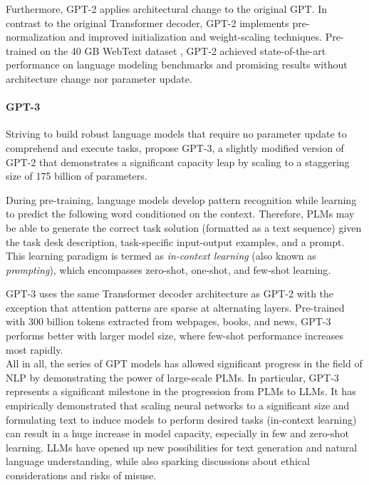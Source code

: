 Furthermore, \ac{GPT}-2 applies architectural change to the original \ac{GPT}. In contrast to the original Transformer decoder, \ac{GPT}-2 implements pre-normalization and improved initialization and weight-scaling techniques. Pre-trained on the 40 GB WebText dataset \citep{radford2019language}, \ac{GPT}-2 achieved state-of-the-art performance on language modeling benchmarks and promising results without architecture change nor parameter update.


\paragraph{GPT-3}

Striving to build robust language models that require no parameter update to comprehend and execute tasks, \citet{brown2020language} propose \ac{GPT}-3, a slightly modified version of \ac{GPT}-2 that demonstrates a significant capacity leap by scaling to a staggering size of 175 billion of parameters. 

During pre-training, language models develop pattern recognition while learning to predict the following word conditioned on the context. Therefore, \acp{PLM} may be able to generate the correct task solution (formatted as a text sequence) given the task desk description, task-specific input-output examples, and a prompt. This learning paradigm is termed as \textit{in-context learning} (also known as \textit{prompting}), which encompasses zero-shot, one-shot, and few-shot learning. 

\ac{GPT}-3 uses the same Transformer decoder architecture as \ac{GPT}-2 with the exception that attention patterns are sparse at alternating layers. Pre-trained with 300 billion tokens extracted from webpages, books, and news, \ac{GPT}-3 performs better with larger model size, where few-shot performance increases most rapidly. \\

All in all, the series of \ac{GPT} models has allowed significant progress in the field of \ac{NLP} by demonstrating the power of large-scale \acp{PLM}. In particular, \ac{GPT}-3 represents a significant milestone in the progression from \acp{PLM} to \acp{LLM}. It has empirically demonstrated that scaling neural networks to a significant size and formulating text to induce models to perform desired tasks (in-context learning) can result in a huge increase in model capacity, especially in few and zero-shot learning. \acp{LLM} have opened up new possibilities for text generation and natural language understanding, while also sparking discussions about ethical considerations and risks of misuse.

